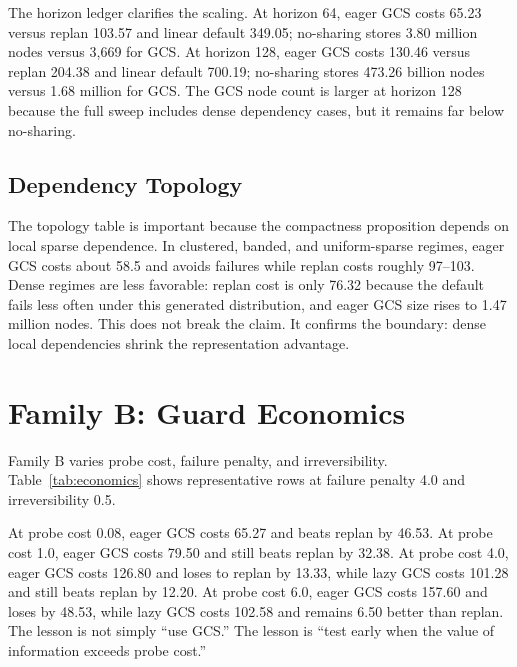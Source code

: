 \documentclass{article}
\begin{document}
The horizon ledger clarifies the scaling. At horizon 64, eager GCS costs 65.23 versus replan 103.57 and linear default 349.05; no-sharing stores 3.80 million nodes versus 3,669 for GCS. At horizon 128, eager GCS costs 130.46 versus replan 204.38 and linear default 700.19; no-sharing stores 473.26 billion nodes versus 1.68 million for GCS. The GCS node count is larger at horizon 128 because the full sweep includes dense dependency cases, but it remains far below no-sharing.

\subsection{Dependency Topology}
\begin{table}[t]
\centering
\caption{Family A dependency-topology ledger. Dense regimes reduce the cost advantage and inflate GCS size, but no-sharing remains much larger.}
\label{tab:topology}
\small

\end{table}

The topology table is important because the compactness proposition depends on local sparse dependence. In clustered, banded, and uniform-sparse regimes, eager GCS costs about 58.5 and avoids failures while replan costs roughly 97--103. Dense regimes are less favorable: replan cost is only 76.32 because the default fails less often under this generated distribution, and eager GCS size rises to 1.47 million nodes. This does not break the claim. It confirms the boundary: dense local dependencies shrink the representation advantage.

\section{Family B: Guard Economics}
Family B varies probe cost, failure penalty, and irreversibility. Table~\ref{tab:economics} shows representative rows at failure penalty 4.0 and irreversibility 0.5.

\begin{table}[t]
\centering
\caption{Family B guard economics. Positive $\Delta$ means the method is worse than replan-on-failure.}
\label{tab:economics}
\small

\end{table}

At probe cost 0.08, eager GCS costs 65.27 and beats replan by 46.53. At probe cost 1.0, eager GCS costs 79.50 and still beats replan by 32.38. At probe cost 4.0, eager GCS costs 126.80 and loses to replan by 13.33, while lazy GCS costs 101.28 and still beats replan by 12.20. At probe cost 6.0, eager GCS costs 157.60 and loses by 48.53, while lazy GCS costs 102.58 and remains 6.50 better than replan. The lesson is not simply ``use GCS.'' The lesson is ``test early when the value of information exceeds probe cost.''
\end{document}
